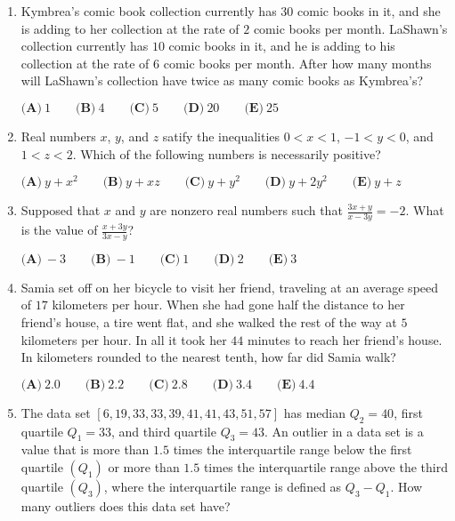 \documentclass{article}
\begin{document}
\begin{enumerate}[label=\arabic*., itemsep=0.5em]\item Kymbrea's comic book collection currently has \(30\) comic books in it, and she is adding to her collection at the rate of \(2\) comic books per month. LaShawn's collection currently has \(10\) comic books in it, and he is adding to his collection at the rate of \(6\) comic books per month. After how many months will LaShawn's collection have twice as many comic books as Kymbrea's?

\(\textbf{(A)}\ 1\qquad\textbf{(B)}\ 4\qquad\textbf{(C)}\ 5\qquad\textbf{(D)}\ 20\qquad\textbf{(E)}\ 25\)\par \vspace{0.5em}\item Real numbers \(x\), \(y\), and \(z\) satify the inequalities
\(0<x<1\), \(-1<y<0\), and \(1<z<2\).
Which of the following numbers is necessarily positive?

\(\textbf{(A)}\ y+x^2\qquad\textbf{(B)}\ y+xz\qquad\textbf{(C)}\ y+y^2\qquad\textbf{(D)}\ y+2y^2\qquad\textbf{(E)}\ y+z\)\par \vspace{0.5em}\item Supposed that \(x\) and \(y\) are nonzero real numbers such that \(\frac{3x+y}{x-3y}=-2\). What is the value of \(\frac{x+3y}{3x-y}\)?

\(\textbf{(A)}\ -3\qquad\textbf{(B)}\ -1\qquad\textbf{(C)}\ 1\qquad\textbf{(D)}\ 2\qquad\textbf{(E)}\ 3\)\par \vspace{0.5em}\item Samia set off on her bicycle to visit her friend, traveling at an average speed of \(17\) kilometers per hour. When she had gone half the distance to her friend's house, a tire went flat, and she walked the rest of the way at \(5\) kilometers per hour. In all it took her \(44\) minutes to reach her friend's house. In kilometers rounded to the nearest tenth, how far did Samia walk?

\(\textbf{(A)}\ 2.0\qquad\textbf{(B)}\ 2.2\qquad\textbf{(C)}\ 2.8\qquad\textbf{(D)}\ 3.4\qquad\textbf{(E)}\ 4.4\)\par \vspace{0.5em}\item The data set \([6,19,33,33,39,41,41,43,51,57]\) has median \(Q_2 = 40\), first quartile \(Q_1 = 33\), and third quartile \(Q_3=43\). An outlier in a data set is a value that is more than \(1.5\) times the interquartile range below the first quartile \((Q_1)\) or more than \(1.5\) times the interquartile range above the third quartile \((Q_3)\), where the interquartile range is defined as \(Q_3 - Q_1\). How many outliers does this data set have?


\end{enumerate}
\end{document}
